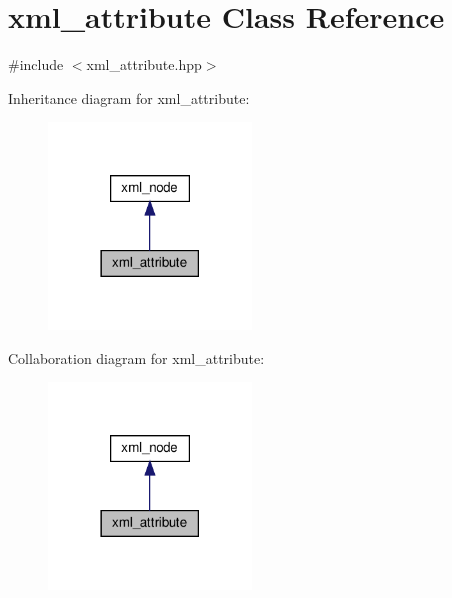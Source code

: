 \hypertarget{classxml__attribute}{}\section{xml\+\_\+attribute Class Reference}
\label{classxml__attribute}


{\ttfamily \#include $<$xml\+\_\+attribute.\+hpp$>$}



Inheritance diagram for xml\+\_\+attribute\+:
\nopagebreak
\begin{figure}[H]
\begin{center}
\leavevmode
\includegraphics[width=153pt]{d4/d22/classxml__attribute__inherit__graph}
\end{center}
\end{figure}


Collaboration diagram for xml\+\_\+attribute\+:
\nopagebreak
\begin{figure}[H]
\begin{center}
\leavevmode
\includegraphics[width=153pt]{de/d69/classxml__attribute__coll__graph}
\end{center}
\end{figure}

